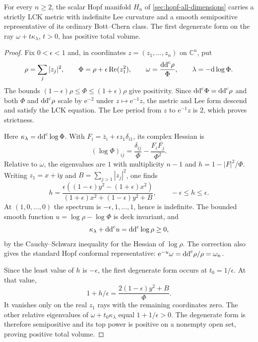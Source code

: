 \begin{example}\label{lck:indefinite-hopf-lee}
For every $n\geq2$, the scalar Hopf manifold $H_n$ of
\cref{sec:hopf-all-dimensions} carries a strictly LCK metric with
indefinite Lee curvature and a smooth semipositive representative
of its ordinary Bott--Chern class. The first degenerate form on
the ray $\omega+t\kappa_\lambda$, $t>0$, has positive total
volume.
\end{example}
\begin{proof}
Fix $0<\epsilon<1$ and, in coordinates $z=(z_1,\ldots,z_n)$ on
$\mathbb C^n$, put
\[
 \rho=\sum_j|z_j|^2,\qquad
 \Phi=\rho+\epsilon\operatorname{Re}(z_1^2),\qquad
 \omega=\frac{\mathrm{dd}^{\mathrm{c}}\rho}{\Phi},\qquad
 \lambda=-\mathrm d\log\Phi.
\]
The bounds $(1-\epsilon)\rho\leq\Phi\leq(1+\epsilon)\rho$
give positivity. Since $\mathrm{dd}^{\mathrm{c}}\Phi=\mathrm{dd}^{\mathrm{c}}\rho$ and both $\Phi$
and $\mathrm{dd}^{\mathrm{c}}\rho$ scale by $\mathrm e^{-2}$ under $z\mapsto\mathrm e^{-1}z$,
the metric and Lee form descend and satisfy the LCK equation.
The Lee period from $z$ to $\mathrm e^{-1}z$ is $2$,
which proves strictness.

Here $\kappa_\lambda=\mathrm{dd}^{\mathrm{c}}\log\Phi$. With
$F_i=\bar z_i+\epsilon z_1\delta_{i1}$, its complex Hessian is
\[
 (\log\Phi)_{i\bar j}
 =\frac{\delta_{ij}}{\Phi}
       -\frac{F_i\overline{F_j}}{\Phi^2}.
\]
Relative to $\omega$, the eigenvalues are $1$ with multiplicity
$n-1$ and $h=1-|F|^2/\Phi$. Writing $z_1=x+\mathrm i y$ and
$B=\sum_{j>1}|z_j|^2$, one finds
\[
 h=\frac{\epsilon((1-\epsilon)y^2-(1+\epsilon)x^2)}
           {(1+\epsilon)x^2+(1-\epsilon)y^2+B},
 \qquad -\epsilon\leq h\leq\epsilon.
\]
At $(1,0,\ldots,0)$ the spectrum is
$-\epsilon,1,\ldots,1$, hence is indefinite. The bounded smooth
function $u=\log\rho-\log\Phi$ is deck invariant, and
\[
 \kappa_\lambda+\mathrm{dd}^{\mathrm{c}} u=\mathrm{dd}^{\mathrm{c}}\log\rho\geq0,
\]
by the Cauchy--Schwarz inequality for the Hessian of $\log\rho$.
The correction also gives the standard Hopf conformal representative:
$\mathrm e^{-u}\omega=\mathrm{dd}^{\mathrm{c}}\rho/\rho=\omega_n$.

Since the least value of $h$ is $-\epsilon$, the first degenerate
form occurs at $t_0=1/\epsilon$. At that value,
\[
 1+h/\epsilon=\frac{2(1-\epsilon)y^2+B}{\Phi}.
\]
It vanishes only on the real $z_1$ rays with the remaining
coordinates zero. The other relative eigenvalues of
$\omega+t_0\kappa_\lambda$ equal $1+1/\epsilon>0$.
The degenerate form is therefore semipositive and its top power
is positive on a nonempty open set, proving positive total volume.
\end{proof}

